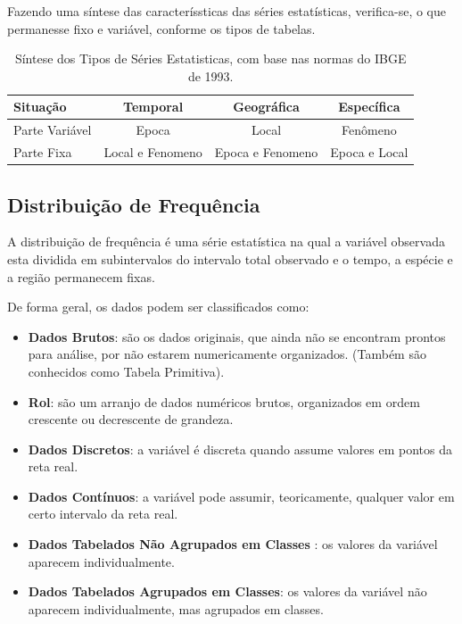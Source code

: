 Fazendo uma síntese das caracteríssticas das séries estatísticas, verifica-se, o que permanesse fixo e variável, conforme os tipos de tabelas.


\begin{table}[!htb]
    \centering
    {
    \caption{Síntese dos Tipos de Séries Estatisticas, com base nas normas
do IBGE de 1993.}
    \label{sintese serie}
    \vspace{0.1cm}
\begin{tabular}{l||c||c||c}
  \hline\hline
  Situação       & Temporal          & Geográfica       & Específica     \\
  \hline\hline
  Parte Variável &  Epoca            & Local            & Fenômeno      \\
  Parte Fixa     &  Local e Fenomeno & Epoca e Fenomeno & Epoca e Local \\
  \hline\hline
\end{tabular}}
\end{table}












\newpage
\subsection{Distribuição de Frequência}

\inic A distribuição de frequência é uma série estatística na qual a variável observada esta dividida em subintervalos do intervalo total observado e o tempo, a espécie e a região permanecem fixas.\vskip0.3cm

De forma geral, os dados podem ser classificados como:


\begin{itemize}
  \item \textbf{Dados Brutos}: são os dados originais, que ainda não se encontram prontos para análise, por não estarem numericamente organizados. (Também são conhecidos como Tabela Primitiva).
  \item \textbf{Rol}: são um arranjo de dados numéricos brutos, organizados em ordem crescente ou decrescente de grandeza.
  \item \textbf{Dados Discretos}: a variável é discreta quando assume valores em pontos da reta real.
  \item \textbf{Dados Contínuos}: a variável pode assumir, teoricamente, qualquer valor em certo intervalo da reta real.
  \item \textbf{Dados Tabelados Não Agrupados em Classes} : os valores da variável aparecem individualmente.
  \item \textbf{Dados Tabelados Agrupados em Classes}: os valores da variável não aparecem individualmente, mas agrupados em classes.
\end{itemize}


